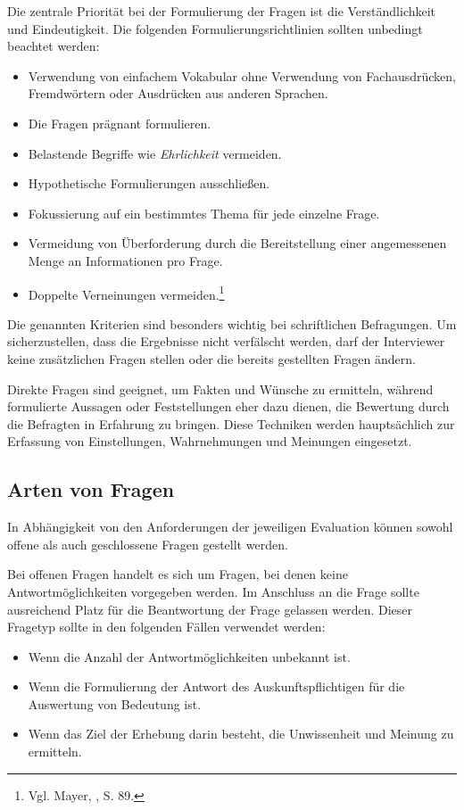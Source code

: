 Die zentrale Priorität bei der Formulierung der Fragen ist die Verständlichkeit und Eindeutigkeit. Die folgenden
Formulierungsrichtlinien sollten unbedingt beachtet werden:
\begin{itemize}
    \item Verwendung von einfachem Vokabular ohne Verwendung von Fachausdrücken, Fremdwörtern oder Ausdrücken aus anderen Sprachen.
    \item Die Fragen prägnant formulieren.
    \item Belastende Begriffe wie \textit{Ehrlichkeit} vermeiden.
    \item Hypothetische Formulierungen ausschließen.
    \item Fokussierung auf ein bestimmtes Thema für jede einzelne Frage.
    \item Vermeidung von Überforderung durch die Bereitstellung einer angemessenen Menge an Informationen pro Frage.
    \item Doppelte Verneinungen vermeiden.\footnote{Vgl. Mayer, \cite{Interview und schriftliche Befragung}, S. 89.}\\
\end{itemize}

Die genannten Kriterien sind besonders wichtig bei schriftlichen Befragungen. Um sicherzustellen, dass die Ergebnisse nicht
verfälscht werden, darf der Interviewer keine zusätzlichen Fragen stellen oder die bereits gestellten Fragen ändern.

Direkte Fragen sind geeignet, um Fakten und Wünsche zu ermitteln, während formulierte Aussagen oder Feststellungen eher
dazu dienen, die Bewertung durch die Befragten in Erfahrung zu bringen. Diese Techniken werden hauptsächlich zur Erfassung
von Einstellungen, Wahrnehmungen und Meinungen eingesetzt.

\subsection{Arten von Fragen}
In Abhängigkeit von den Anforderungen der jeweiligen Evaluation können sowohl offene als auch geschlossene Fragen gestellt werden.

Bei offenen Fragen handelt es sich um Fragen, bei denen keine Antwortmöglichkeiten vorgegeben werden. Im Anschluss an die
Frage sollte ausreichend Platz für die Beantwortung der Frage gelassen werden. Dieser Fragetyp sollte in den folgenden
Fällen verwendet werden:
\begin{itemize}
    \item Wenn die Anzahl der Antwortmöglichkeiten unbekannt ist.
    \item Wenn die Formulierung der Antwort des Auskunftspflichtigen für die Auswertung von Bedeutung ist.
    \item Wenn das Ziel der Erhebung darin besteht, die Unwissenheit und Meinung zu ermitteln.\\
\end{itemize}

